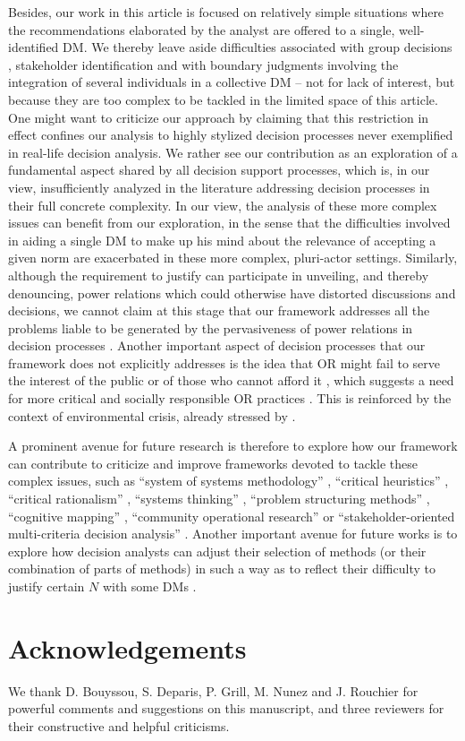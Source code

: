 \documentclass[preprint, french, english, 11pt, authoryear]{elsarticle}%
\begin{document}
Besides, our work in this article is focused on relatively simple situations where the recommendations elaborated by the analyst are offered to a single, well-identified \ac{DM}.
We thereby leave aside difficulties associated with group decisions \citep{jackson_towards_1984}, stakeholder identification \citep{wang_systemic_2015} and with boundary judgments involving the integration of several individuals in a collective \ac{DM} \citep{midgley_systemic_2000}
-- not for lack of interest, but because they are too complex to be tackled in the limited space of this article. One might want to criticize our approach by claiming that this restriction in effect confines our analysis to highly stylized decision processes never exemplified in real-life decision analysis.
We rather see our contribution as an exploration of a fundamental aspect shared by all decision support processes, which is, in our view, insufficiently analyzed in the literature addressing decision processes in their full concrete complexity.
In our view, the analysis of these more complex issues can benefit from our exploration, in the sense that the difficulties involved in aiding a single \ac{DM} to make up his mind about the relevance of accepting a given norm are exacerbated in these more complex, pluri-actor settings. 
Similarly, although the requirement to justify can participate in unveiling, and thereby denouncing, power relations which could otherwise have distorted discussions and decisions, 
we cannot claim at this stage that our framework addresses all the problems liable to be generated by the pervasiveness of power relations in decision processes \citep{cronin_issues_2014}.
Another important aspect of decision processes that our framework does not explicitly addresses is the idea that \ac{OR} might fail to serve the interest of the public or of those who cannot afford it \citep{rosenhead_report_1986}, 
which suggests a need for more critical and socially responsible \ac{OR} practices \citep{jackson_systems_2000,ulrich_beyond_2003}. This is reinforced by the context of environmental crisis, already stressed by \citet{churchman_operations_1970}.

A prominent avenue for future research is therefore to explore how our framework can contribute to criticize and improve frameworks devoted to tackle these complex issues, such as ``system of systems methodology'' \citep{jackson_towards_1984}, ``critical heuristics'' \citep{ulrich_critical_1987}, 
``critical rationalism'' \citep{ormerod_critical_2014}, ``systems thinking'' \citep{mingers_review_2010}, ``problem structuring methods'' \citep{hector_problem-structuring_2009}, ``cognitive mapping'' \citep{eden_analyzing_2004}, ``community operational research'' \citep{johnson_emerging_2018} or 
``stakeholder-oriented multi-criteria decision analysis'' \citep{de_brucker_multi-criteria_2013}. Another important avenue for future works is to explore how decision analysts can adjust their selection of methods (or their combination of parts of methods) in such a way as to reflect their difficulty to justify certain $N$ with some \acp{DM} \citep{mingers_towards_1997}.


\setcounter{secnumdepth}{0}
\section{Acknowledgements}
We thank D. Bouyssou, S. Deparis, P. Grill, M. Nunez and J. Rouchier for powerful comments and suggestions on this manuscript, and three reviewers for their constructive and helpful criticisms.


\end{document}
